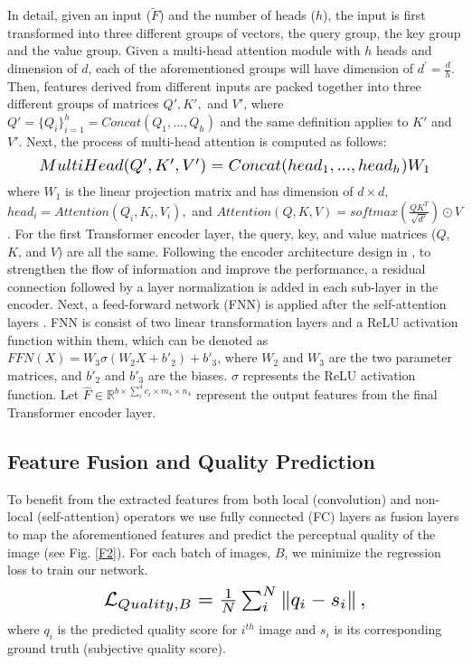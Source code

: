 \documentclass[10pt,twocolumn,letterpaper]{article}
\begin{document}
In detail, given an input ($\tilde{F}$) and the number of heads ($\mathit{h}$), the input  is first transformed into three different
groups of vectors,  the query group, the key group and
the value group. 
Given a multi-head attention module with $\mathit{h}$ heads and  dimension of $d$, each of the aforementioned groups will have dimension of $d^{'}=\frac{d}{h}$.
Then, features derived from different inputs are packed together
into three different groups of matrices $Q',K',$ and $V'$, where $Q' = \{Q_{i}\}_{i=1}^{h}=Concat(Q_{1},...,Q_{h})$ and the same definition applies to $K'$ and $V'$. 
Next, the process of multi-head attention is computed as follows:
\vspace{-0.2 cm}
\begin{equation}
\resizebox{.9\hsize}{!}{${MultiHead}(Q',K',V')=Concat({head}_{1},...,{head}_{h})W_1$}
\end{equation}
where $\mathit{W_1}$ is   the linear projection matrix and has dimension of $d\times d$, ${head}_{i}={Attention}(Q_{i},K_{i},V_{i}),$ and  $Attention(Q,K,V)=softmax(\frac{Q K^{T}}{\sqrt{d'}})\odot V$.
For the first Transformer encoder layer, the query, key, and value matrices ($Q$, $K$, and $V$) are all the same.
Following the encoder architecture design in \cite{vaswani2017attention}, to strengthen the flow of information and improve the performance,  a residual connection followed by a layer normalization is added in each sub-layer in the encoder.
Next, a feed-forward network (FNN) is
applied after the self-attention layers \cite{vaswani2017attention}. 
FNN is consist of two
linear transformation layers and a ReLU activation function
within them, which can be denoted as  $FFN(X) = {W_3}\sigma({W_2}X + b'_2) + b'_3$,
where $\mathit{W_2}$ and $\mathit{W_3}$ are the two parameter matrices, and $b'_2$ and $b'_3$ are the biases. $\sigma$ represents the ReLU activation function.
Let $\hat{F}\in\mathbb{R}^{b\times\sum_{i}^{4}c_{i}\times m_{4}\times n_{4}}$ represent the output features from the final Transformer encoder layer.




\subsection{Feature Fusion and Quality Prediction}
\label{S3.3}
To benefit from the extracted features from both local (convolution) and non-local (self-attention) operators 
we use fully connected (FC) layers  as  fusion layers to map the aforementioned features and predict the perceptual quality of the image (see Fig. \ref{F2}).
For each batch of images, $B$, we minimize the  regression loss to train our network.
\begin{equation}
\label{E3}
\resizebox{.6\hsize}{!}{$\mathcal{L}_{Quality,B}=\frac{1}{N}\sum_{i}^{N}\left\Vert q_{i}-s_{i}\right\Vert,$}
\end{equation}
where $q_i$ is the predicted quality score for $i^{th}$ image and $s_i$ is its corresponding ground truth (subjective  quality score).
 
\end{document}
